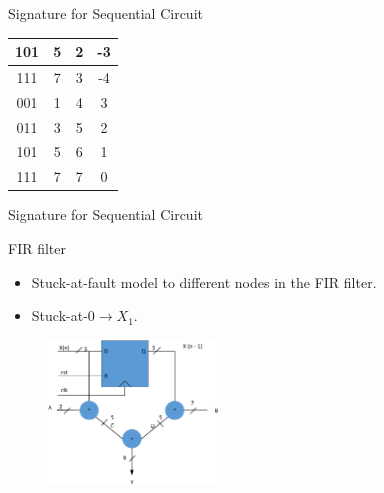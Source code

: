 \documentclass[aspectratio=1610]{beamer}
\begin{document}
\begin{frame}{Signature for Sequential Circuit}
\begin{table}[tb!]
{\begin{tabular}{|c | c| c | c| }
 101 & 5 & 2 & -3 \\
 \hline
 111& 7& 3& -4 \\
 \hline
 001 & 1  &  4& 3 \\
 \hline
 011 & 3 & 5 &2  \\
 \hline
 101 & 5 & 6 & 1 \\
 \hline
 111 & 7 & 7 & 0 \\
 \hline
 
 
\end{tabular}
}
\end{table}







\end{frame}

\begin{frame}{Signature for Sequential Circuit}

\begin{block}{FIR filter}
\end{block}
\begin{itemize}
\item Stuck-at-fault model to different nodes in the FIR filter.
\item Stuck-at-0$\rightarrow X_1$.
\end{itemize}


\begin{figure}[tb!]
 \centering
  \captionsetup{justification=centering}    
   \includegraphics[width=0.4\textwidth, right]{Figures/FIR.pdf}
   
\label{fig:filter}
\end{figure}

\vspace{-6.0cm}

\begin{table}[tb!]
\hspace{-6.0cm}
\end{table}
\end{frame}
\end{document}
